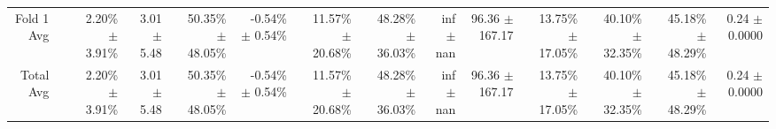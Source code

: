 \begin{table}[H]
{\begin{tabular}{rrrrrrrrrrrrrr}
\midrule
\midrule
Fold 1 Avg &  & \shortstack{2.20\% \\ $\pm$ 3.91\%} & \shortstack{3.01 \\ $\pm$ 5.48} & \shortstack{50.35\% \\ $\pm$ 48.05\%} & \shortstack{-0.54\% \\ $\pm$ 0.54\%} & \shortstack{11.57\% \\ $\pm$ 20.68\%} & \shortstack{48.28\% \\ $\pm$ 36.03\%} & \shortstack{inf \\ $\pm$ nan} & \shortstack{96.36 \\ $\pm$ 167.17} & \shortstack{13.75\% \\ $\pm$ 17.05\%} & \shortstack{40.10\% \\ $\pm$ 32.35\%} & \shortstack{45.18\% \\ $\pm$ 48.29\%} & \shortstack{0.24 \\ $\pm$ 0.0000} \\
Total Avg &  & \shortstack{2.20\% \\ $\pm$ 3.91\%} & \shortstack{3.01 \\ $\pm$ 5.48} & \shortstack{50.35\% \\ $\pm$ 48.05\%} & \shortstack{-0.54\% \\ $\pm$ 0.54\%} & \shortstack{11.57\% \\ $\pm$ 20.68\%} & \shortstack{48.28\% \\ $\pm$ 36.03\%} & \shortstack{inf \\ $\pm$ nan} & \shortstack{96.36 \\ $\pm$ 167.17} & \shortstack{13.75\% \\ $\pm$ 17.05\%} & \shortstack{40.10\% \\ $\pm$ 32.35\%} & \shortstack{45.18\% \\ $\pm$ 48.29\%} & \shortstack{0.24 \\ $\pm$ 0.0000} \\
\bottomrule
\end{tabular}}
\end{table}
